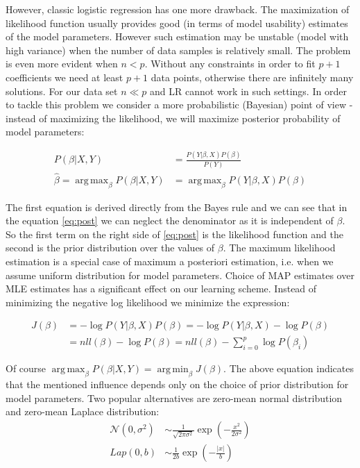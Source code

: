 \documentclass[shortabstract, english, mgr]{iithesis}
\DeclareMathOperator*{\argmax}{arg\,max}
\DeclareMathOperator*{\argmin}{arg\,min}
\begin{document}
However, classic logistic regression has one more drawback. The maximization of likelihood function usually provides good (in terms of model usability) estimates of the model parameters. However such estimation may be unstable (model with high variance) when the number of data samples is relatively small. The problem is even more evident when $n < p$. Without any constraints in order to fit $p+1$ coefficients we need at least $p+1$ data points, otherwise there are infinitely many solutions. For our data set $n \ll p$ and LR cannot work in such settings. In order to tackle this problem we consider a more probabilistic (Bayesian) point of view - instead of maximizing the likelihood, we will maximize posterior probability of model parameters:

\begin{align}
    P(\beta| X,Y) &= \frac{P(Y | \beta, X)P(\beta)}{P(Y)} \nonumber \\
    \hat{\beta} = \argmax_{\beta} P(\beta| X,Y) &= \argmax_{\beta} P(Y | \beta, X)P(\beta) \label{eq:post}
\end{align}

The first equation is derived directly from the Bayes rule and we can see that in the equation \ref{eq:post} we can neglect the denominator as it is independent of $\beta$. So the first term on the right side of \ref{eq:post} is the likelihood function and the second is the prior distribution over the values of $\beta$. The maximum likelihood estimation is a special case of maximum a posteriori estimation, i.e. when we assume uniform distribution for model parameters.  Choice of MAP estimates over MLE estimates has a significant effect on our learning scheme. Instead of minimizing the negative log likelihood we minimize the expression:

\begin{align}
    J(\beta) &= - \log P(Y | \beta, X)P(\beta) =  - \log P(Y | \beta, X) - \log P(\beta) \nonumber \\ &= nll(\beta) - \log P(\beta) = nll(\beta) - \sum_{i=0}^p \log P(\beta_i) \label{eq:learnPost}
\end{align}

Of course $\argmax_{\beta} P(\beta| X,Y) = \argmin_{\beta} J(\beta)$. The above equation indicates that the mentioned influence depends only on the choice of prior distribution for model parameters. Two popular alternatives are zero-mean normal distribution and zero-mean Laplace distribution:
\begin{align*}
    \mathcal{N}(0, \sigma^2) &\sim \frac{1}{\sqrt{2 \pi \sigma^{2}}} \exp \left(-\frac{x^{2}}{2 \sigma^{2}}\right) \\
    Lap(0, b) &\sim \frac{1}{2 b} \exp \left(-\frac{|x|}{b}\right)
\end{align*}
\end{document}
